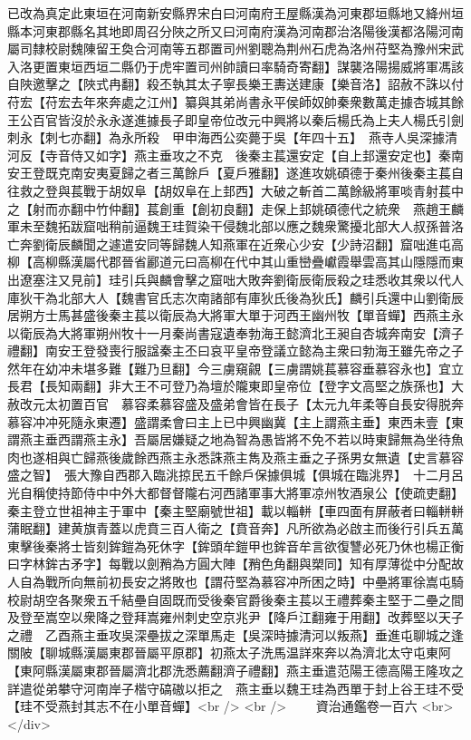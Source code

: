 已改為真定此東垣在河南新安縣界宋白曰河南府王屋縣漢為河東郡垣縣地又絳州垣縣本河東郡縣名其地即周召分陜之所又曰河南府漢為河南郡治洛陽後漢都洛陽河南屬司隸校尉魏陳留王奐合河南等五郡置司州劉聰為荆州石虎為洛州苻堅為豫州宋武入洛更置東垣西垣二縣仍于虎牢置司州帥讀曰率騎奇寄翻】謀襲洛陽揚威將軍馮該自陜邀擊之【陜式冉翻】殺丕執其太子寧長樂王夀送建康【樂音洛】詔赦不誅以付苻宏【苻宏去年來奔處之江州】纂與其弟尚書永平侯師奴帥秦衆數萬走據杏城其餘王公百官皆沒於永永遂進據長子即皇帝位改元中興將以秦后楊氏為上夫人楊氏引劍刺永【刺七亦翻】為永所殺　甲申海西公奕薨于吳【年四十五】　燕寺人吳深據清河反【寺音侍又如字】燕主垂攻之不克　後秦主萇還安定【自上邽還安定也】秦南安王登既克南安夷夏歸之者三萬餘戶【夏戶雅翻】遂進攻姚碩德于秦州後秦主萇自往救之登與萇戰于胡奴阜【胡奴阜在上邽西】大破之斬首二萬餘級將軍啖青射萇中之【射而亦翻中竹仲翻】萇創重【創初良翻】走保上邽姚碩德代之統衆　燕趙王麟軍未至魏拓跋窟咄稍前逼魏王珪賀染干侵魏北部以應之魏衆驚擾北部大人叔孫普洛亡奔劉衛辰麟聞之遽遣安同等歸魏人知燕軍在近衆心少安【少詩沼翻】窟咄進屯高柳【高柳縣漢屬代郡晉省酈道元曰高柳在代中其山重巒疊巘霞舉雲高其山隱隱而東出遼塞注又見前】珪引兵與麟會擊之窟咄大敗奔劉衛辰衛辰殺之珪悉收其衆以代人庫狄干為北部大人【魏書官氏志次南諸部有庫狄氏後為狄氏】麟引兵還中山劉衛辰居朔方士馬甚盛後秦主萇以衛辰為大將軍大單于河西王幽州牧【單音蟬】西燕主永以衛辰為大將軍朔州牧十一月秦尚書寇遺奉勃海王懿濟北王昶自杏城奔南安【濟子禮翻】南安王登發喪行服諡秦主丕曰哀平皇帝登議立懿為主衆曰勃海王雖先帝之子然年在幼冲未堪多難【難乃旦翻】今三虜窺覦【三虜謂姚萇慕容垂慕容永也】宜立長君【長知兩翻】非大王不可登乃為壇於隴東即皇帝位【登字文高堅之族孫也】大赦改元太初置百官　慕容柔慕容盛及盛弟會皆在長子【太元九年柔等自長安得脱奔慕容冲冲死隨永東遷】盛謂柔會曰主上已中興幽冀【主上謂燕主垂】東西未壹【東謂燕主垂西謂燕主永】吾屬居嫌疑之地為智為愚皆將不免不若以時東歸無為坐待魚肉也遂相與亡歸燕後歲餘西燕主永悉誅燕主雋及燕主垂之子孫男女無遺【史言慕容盛之智】　張大豫自西郡入臨洮掠民五千餘戶保據俱城【俱城在臨洮界】　十二月呂光自稱使持節侍中中外大都督督隴右河西諸軍事大將軍凉州牧酒泉公【使疏吏翻】　秦主登立世祖神主于軍中【秦主堅廟號世祖】載以輜軿【車四面有屏蔽者曰輜軿軿蒲眠翻】建黄旗青蓋以虎賁三百人衛之【賁音奔】凡所欲為必啟主而後行引兵五萬東擊後秦將士皆刻鉾鎧為死休字【鉾頭牟鎧甲也鉾音牟言欲復讐必死乃休也楊正衡曰字林鉾古矛字】每戰以劍矟為方圓大陣【矟色角翻與槊同】知有厚薄從中分配故人自為戰所向無前初長安之將敗也【謂苻堅為慕容冲所困之時】中壘將軍徐嵩屯騎校尉胡空各聚衆五千結壘自固既而受後秦官爵後秦主萇以王禮葬秦主堅于二壘之間及登至嵩空以衆降之登拜嵩雍州刺史空京兆尹【降戶江翻雍于用翻】改葬堅以天子之禮　乙酉燕主垂攻吳深壘拔之深單馬走【吳深時據清河以叛燕】垂進屯聊城之逢關陂【聊城縣漢屬東郡晉屬平原郡】初燕太子洗馬温詳來奔以為濟北太守屯東阿【東阿縣漢屬東郡晉屬濟北郡洗悉薦翻濟子禮翻】燕主垂遣范陽王德高陽王隆攻之詳遣從弟攀守河南岸子楷守碻磝以拒之　燕主垂以魏王珪為西單于封上谷王珪不受【珪不受燕封其志不在小單音蟬】<br />
<br />
　　資治通鑑卷一百六  <br>
   </div> 


